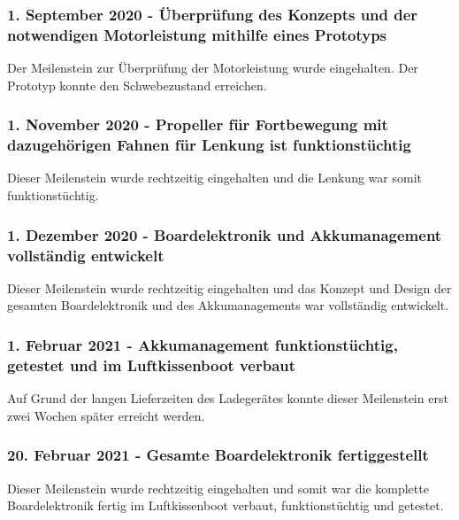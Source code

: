
\subsubsection*{1. September 2020 - Überprüfung des Konzepts und der notwendigen Motorleistung mithilfe eines Prototyps}
Der Meilenstein zur Überprüfung der Motorleistung wurde eingehalten. Der Prototyp konnte den Schwebezustand erreichen. \\

\subsubsection*{1. November 2020 - Propeller für Fortbewegung mit dazugehörigen Fahnen für Lenkung ist funktionstüchtig}
Dieser Meilenstein wurde rechtzeitig eingehalten und die Lenkung war somit \\ funktionstüchtig. \\

\subsubsection*{1. Dezember 2020 - Boardelektronik und  Akkumanagement vollständig entwickelt}
Dieser Meilenstein wurde rechtzeitig eingehalten und das Konzept und Design der gesamten Boardelektronik und des Akkumanagements war vollständig entwickelt. \\

\subsubsection*{1. Februar 2021 - Akkumanagement funktionstüchtig, getestet und im Luftkissenboot verbaut}
Auf Grund der langen Lieferzeiten des Ladegerätes konnte dieser Meilenstein erst zwei Wochen später erreicht werden. \\

\subsubsection*{20. Februar 2021 - Gesamte Boardelektronik fertiggestellt}
Dieser Meilenstein wurde rechtzeitig eingehalten und somit war die komplette \\ Boardelektronik fertig im Luftkissenboot verbaut, funktionstüchtig und getestet. \\ 

